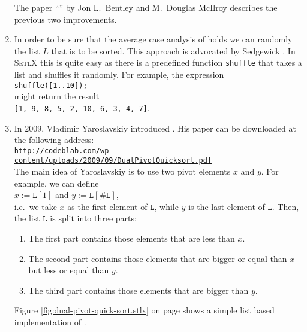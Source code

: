 \begin{enumerate}
      The paper ``'' by Jon L.~Bentley and M.~Douglas McIlroy
      \cite{bentley:93} describes the previous two improvements.
\item In order to be sure that the average case analysis of  holds we can randomly
       the list $L$ that is to be sorted.  This approach is advocated by Sedgewick
      \cite{sedgewick:2011}.  In \textsc{SetlX} this is quite easy as
      there is a predefined function \texttt{shuffle} that takes a list and shuffles it randomly.
      For example, the expression
      \\[0.2cm]
      \hspace*{1.3cm}
      \texttt{shuffle([1..10]);}
      \\[0.2cm]
      might return the result
      \\[0.2cm]
      \hspace*{1.3cm}
      \texttt{[1, 9, 8, 5, 2, 10, 6, 3, 4, 7]}.
\item In 2009, Vladimir Yaroslavskiy introduced  \cite{yaroslavskiy:2009}.  His paper can be
      downloaded at the following address:
      \\[0.2cm]
      \hspace*{-0.3cm}
      \href{http://codeblab.com/wp-content/uploads/2009/09/DualPivotQuicksort.pdf}{\texttt{http://codeblab.com/wp-content/uploads/2009/09/DualPivotQuicksort.pdf}}
      \\[0.2cm]
      The main idea of Yaroslavskiy is to use two pivot elements $x$ and $y$.  For example, we can
      define
      \\[0.2cm]
      \hspace*{1.3cm}
      $x := \mathtt{L}[1]$ \quad and \quad $y := \mathtt{L}[\#\mathtt{L}]$,
      \\[0.2cm]
      i.e.~we take $x$ as the first element of $\mathtt{L}$, while $y$ is the last element of
      $\mathtt{L}$.  Then, the list 
      $\mathtt{L}$ is split into three parts:
      \begin{enumerate}
      \item The first part contains those elements that are less than $x$.
      \item The second part contains those elements that are bigger or equal than $x$ but less or
            equal than $y$.
      \item The third part contains those elements that are bigger than $y$.
      \end{enumerate}
      Figure \ref{fig:dual-pivot-quick-sort.stlx} on page \pageref{fig:dual-pivot-quick-sort.stlx}
      shows a simple list based implementation of .




\end{enumerate}
